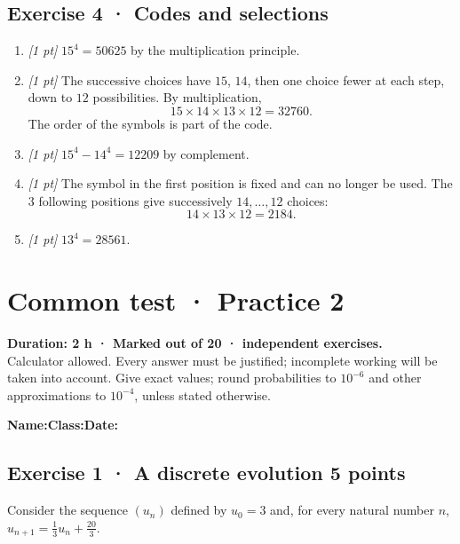 \subsection*{Exercise 4 · Codes and selections}\begin{enumerate}

\item \textit{[1 pt]} $15^4=50625$ by the multiplication principle.

\item \textit{[1 pt]} The successive choices have $15$, $14$, then one choice fewer at each step, down to $12$ possibilities. By multiplication,
\[15\times14\times13\times12=32760.\]
The order of the symbols is part of the code.

\item \textit{[1 pt]} $15^4-14^4=12209$ by complement.

\item \textit{[1 pt]} The symbol in the first position is fixed and can no longer be used. The $3$ following positions give successively $14,\ldots,12$ choices:
\[14\times13\times12=2184.\]

\item \textit{[1 pt]} $13^4=28561$.

\end{enumerate}

\fi

\mxnewpage{}\label{sujet:3-2}

\section*{Common test · Practice 2}


\textbf{Duration: 2 h · Marked out of 20 ·  independent exercises.}\\Calculator allowed. Every answer must be justified; incomplete working will be taken into account. Give exact values; round probabilities to $10^{-6}$ and other approximations to $10^{-4}$, unless stated otherwise.

\smallskip\textbf{Name:}\enspace\dotfill\quad\textbf{Class:}\enspace\dotfill\quad\textbf{Date:}\enspace\dotfill

\subsection*{Exercise 1 · A discrete evolution \hfill 5 points}Consider the sequence $(u_n)$ defined by $u_0=3$ and, for every natural number $n$, $u_{n+1}=\frac{1}{3}u_n+\frac{20}{3}$.


